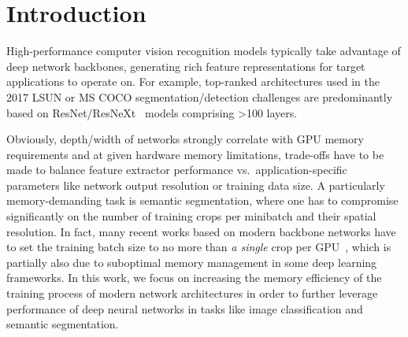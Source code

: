 \documentclass[10pt,twocolumn,letterpaper]{article}
\begin{document}

\section{Introduction}
High-performance computer vision recognition models typically take advantage of deep network backbones, generating rich feature representations for target applications to operate on. For example, top-ranked architectures used in the 2017 LSUN or MS COCO segmentation/detection challenges are predominantly based on ResNet/ResNeXt~\cite{He2015b, Xie2016} models comprising >100 layers. 

Obviously, depth/width of networks strongly correlate with GPU memory requirements and at given hardware memory limitations, trade-offs have to be made to balance feature extractor performance vs.~application-specific parameters like network output resolution or training data size. A particularly memory-demanding task is semantic segmentation, where one has to compromise significantly on the number of training crops per minibatch and their spatial resolution. In fact, many recent works based on modern backbone networks have to set the training batch size to no more than \textit{a single} crop per GPU~\cite{Wu2016,Chen2016}, which is partially also due to suboptimal memory management in some deep learning frameworks. In this work, we focus on increasing the memory efficiency of the training process of modern network architectures in order to further leverage performance of deep neural networks in tasks like image classification and semantic segmentation.
\end{document}
